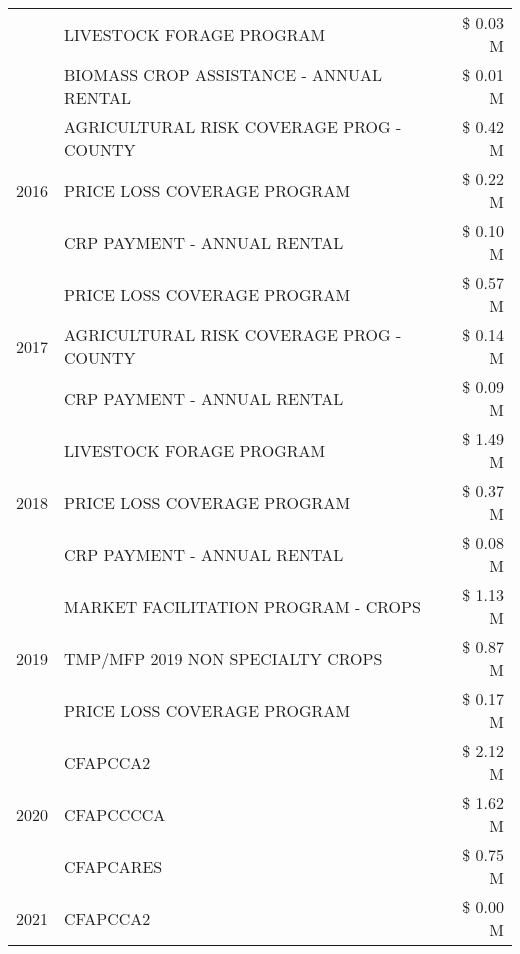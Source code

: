 \begin{tabular}{llr}
 & LIVESTOCK FORAGE PROGRAM & \$ 0.03 M \\
 & BIOMASS CROP ASSISTANCE - ANNUAL RENTAL & \$ 0.01 M \\
\cline{1-3}
\multirow[t]{3}{*}{2016} & AGRICULTURAL RISK COVERAGE PROG - COUNTY & \$ 0.42 M \\
 & PRICE LOSS COVERAGE PROGRAM & \$ 0.22 M \\
 & CRP PAYMENT - ANNUAL RENTAL & \$ 0.10 M \\
\cline{1-3}
\multirow[t]{3}{*}{2017} & PRICE LOSS COVERAGE PROGRAM & \$ 0.57 M \\
 & AGRICULTURAL RISK COVERAGE PROG - COUNTY & \$ 0.14 M \\
 & CRP PAYMENT - ANNUAL RENTAL & \$ 0.09 M \\
\cline{1-3}
\multirow[t]{3}{*}{2018} & LIVESTOCK FORAGE PROGRAM & \$ 1.49 M \\
 & PRICE LOSS COVERAGE PROGRAM & \$ 0.37 M \\
 & CRP PAYMENT - ANNUAL RENTAL & \$ 0.08 M \\
\cline{1-3}
\multirow[t]{3}{*}{2019} & MARKET FACILITATION PROGRAM - CROPS & \$ 1.13 M \\
 & TMP/MFP 2019 NON SPECIALTY CROPS & \$ 0.87 M \\
 & PRICE LOSS COVERAGE PROGRAM & \$ 0.17 M \\
\cline{1-3}
\multirow[t]{3}{*}{2020} & CFAPCCA2 & \$ 2.12 M \\
 & CFAPCCCCA & \$ 1.62 M \\
 & CFAPCARES & \$ 0.75 M \\
\cline{1-3}
2021 & CFAPCCA2 & \$ 0.00 M \\
\cline{1-3}
\bottomrule
\end{tabular}
